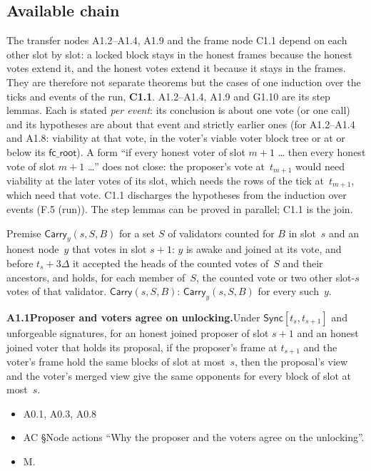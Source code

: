 \documentclass{article}
\newcommand{\fcroot}{\mathsf{fc\_root}}
\newcommand{\dagnode}[6]{%
\par\medskip\noindent\textbf{#1\enspace #2.}\enspace #3
\begin{itemize}[leftmargin=2.2em,itemsep=0pt,topsep=2pt]
\item[\emph{Uses}] #4
\item[\emph{Evid.}] #5
\item[\emph{Task}] #6
\end{itemize}}
\begin{document}
\subsection{Available chain}

The transfer nodes A1.2--A1.4, A1.9 and the frame node C1.1 depend on each other
slot by slot: a locked block stays in the honest frames because the honest
votes extend it, and the honest votes extend it because it stays in the
frames.  They are therefore not separate theorems but the cases of one
induction over the ticks and events of the run, \textbf{C1.1}.  A1.2--A1.4,
A1.9 and G1.10 are its step lemmas.  Each is stated \emph{per event}: its
conclusion is about one vote (or one call) and its hypotheses are about that
event and strictly earlier ones (for A1.2--A1.4 and A1.8: viability at that
vote, in the voter's viable voter block tree or at or below its $\fcroot$).  A
form ``if every honest voter of slot $m+1$ \ldots{} then every honest vote of
slot $m+1$ \ldots'' does not close: the proposer's vote at~$t_{m+1}$ would need
viability at the later votes of its slot, which needs the rows of the tick
at~$t_{m+1}$, which need that vote.  C1.1 discharges the hypotheses from the
induction over events (F.5 (run)).  The step lemmas can be proved in parallel; C1.1
is the join.

Premise $\mathsf{Carry}_y(s,S,B)$ for a set $S$ of validators counted for $B$ in
slot~$s$ and an honest node~$y$ that votes in slot $s+1$: $y$ is awake and joined
at its vote, and before $t_s+3\Delta$ it accepted the heads of the counted
votes of~$S$ and their ancestors, and holds, for each member of~$S$, the counted
vote or two other slot-$s$ votes of that validator.  $\mathsf{Carry}(s,S,B)$:
$\mathsf{Carry}_y(s,S,B)$ for every such~$y$.

\dagnode{A1.1}{Proposer and voters agree on unlocking}{Under
$\mathsf{Sync}[t_s,t_{s+1}]$ and unforgeable signatures, for an honest joined
proposer of slot $s+1$ and an honest joined voter that holds its proposal, if
the proposer's frame at $t_{s+1}$ and the voter's frame hold the same blocks of
slot at most~$s$, then the proposal's view and the voter's merged view give the
same opponents for every block of slot at most~$s$.}
{A0.1, A0.3, A0.8}{AC \S Node actions ``Why the proposer and the voters agree on
the unlocking''.}{M.}
\end{document}
